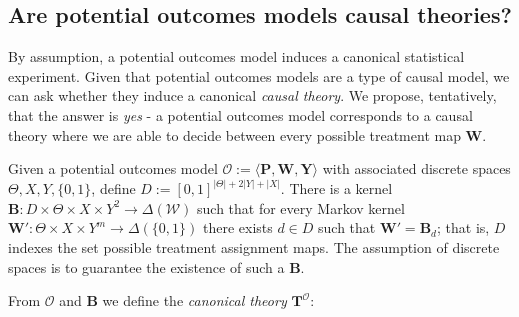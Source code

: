 
\subsection{Are potential outcomes models causal theories?}

By assumption, a potential outcomes model induces a canonical statistical experiment. Given that potential outcomes models are a type of causal model, we can ask whether they induce a canonical \emph{causal theory}. We propose, tentatively, that the answer is \emph{yes} - a potential outcomes model corresponds to a causal theory where we are able to decide between every possible treatment map $\mathbf{W}$.

Given a potential outcomes model $\mathscr{O}:=\langle \mathbf{P}, \mathbf{W}, \mathbf{Y} \rangle$ with associated discrete spaces $\Theta,X,Y,\{0,1\}$, define $D:=[0,1]^{|\Theta|+2|Y|+|X|}$. There is a kernel $\mathbf{B}:D\times\Theta\times X \times Y^2\to \Delta(\mathcal{W})$ such that for every Markov kernel $\mathbf{W}':\Theta\times X\times Y^m\to \Delta(\{0,1\})$ there exists $d\in D$ such that $\mathbf{W}'=\mathbf{B}_d$; that is, $D$ indexes the set possible treatment assignment maps. The assumption of discrete spaces is to guarantee the existence of such a $\mathbf{B}$.

From $\mathscr{O}$ and $\mathbf{B}$ we define the \emph{canonical theory} $\mathbf{T}^{\mathscr{O}}$:

